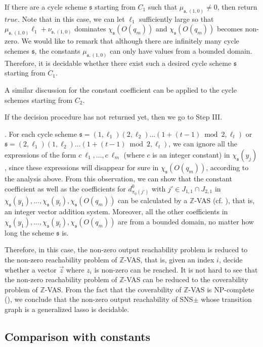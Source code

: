 \documentclass[runningheads,a4paper]{llncs}
\def\schm{{\mathfrak{s} }}
\newcommand\intnum{{\mathbb{Z} }}
\begin{document}
If there are a cycle scheme $\schm$ starting from $C_1$ such that $\mu_{\schm,(1,0)} \neq 0$, then return $true$. Note that in this case, we can let $\ell_1$ sufficiently large so that $\mu_{\schm,(1,0)} \ell_1 + \nu_{\schm,(1,0)}$ dominates $\chi_{\schm}(O(q_m))$ and $\chi_{\schm}(O(q_m))$ becomes non-zero. We would like to remark that although there are infinitely many cycle schemes $\schm$, the constants $\mu_{\schm,(1,0)}$ can only have values from a bounded domain. Therefore, it is decidable whether there exist such a desired cycle scheme $\schm$ starting from $C_1$.

A similar discussion for the constant coefficient can be applied to the cycle schemes starting from $C_2$.

If the decision procedure has not returned yet, then we go to Step III. 

\smallskip

. For each cycle scheme $\schm=(1,\ell_1) (2,\ell_2) \dots (1+ (t-1) \bmod 2,\ell_t)$ or $\schm=(2,\ell_1) (1,\ell_2) \dots (1+ (t-1) \bmod 2,\ell_t)$, we can ignore all the expressions of the form $c\ \ell_1,\dots, c\ \ell_m$ (where $c$ is an integer constant) in $\chi_{\schm}(y_j)$, since these expressions will disappear for sure in $\chi_{\schm}(O(q_m))$, according to the analysis above. From this observation, we can show that the constant coefficient as well as the coefficients for $d^0_{\pi_0(j')}$ with $j' \in J_{1,1} \cap J_{2,1}$ in $\chi_{\schm}(y_1),\dots,\chi_{\schm}(y_l), \chi_{\schm}(O(q_m))$ can be calculated by a $\intnum$-VAS (cf. \cite{HH14}), that is, an integer vector addition system. Moreover, all the other coefficients in $\chi_{\schm}(y_1),\dots,\chi_{\schm}(y_l), \chi_{\schm}(O(q_m))$ are from a bounded domain, no matter how long the scheme $\schm$ is.  

Therefore, in this case, the non-zero output reachability problem is reduced to the non-zero reachability problem of $\intnum$-VAS, that is, given an index $i$, decide whether a vector $\vec{z}$ where $z_i$ is non-zero can be reached.  It is not hard to see that the non-zero reachability problem of $\intnum$-VAS can be reduced to the coverability problem of $\intnum$-VAS. From the fact that the coverability of $\intnum$-VAS is NP-complete (\cite{HH14}),  we conclude that the non-zero output reachability of SNS$\pm$ whose transition graph is a generalized lasso is decidable.


\subsection{Comparison with constants}
\end{document}
